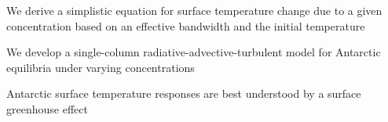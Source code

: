 \documentclass[draft]{agujournal2019}
\begin{document}



\begin{keypoints}
\item We derive a simplistic equation for surface temperature change due to a given  concentration based on an effective bandwidth and the initial temperature
\item We develop a single-column radiative-advective-turbulent model for Antarctic equilibria under varying  concentrations 
\item Antarctic surface temperature responses are best understood by a surface greenhouse effect
\end{keypoints}

%
%

%
%

\end{document}
